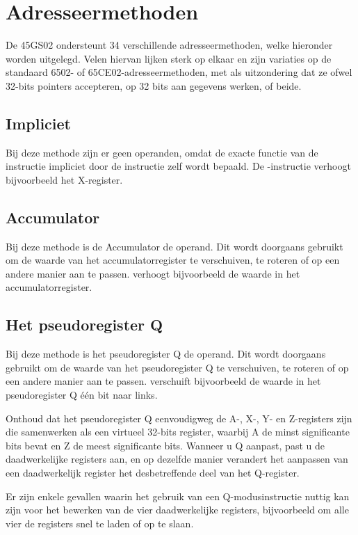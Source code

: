 \section{Adresseermethoden}
\label{sec:addressing-modes}

De 45GS02 ondersteunt 34 verschillende adresseermethoden, welke hieronder worden uitgelegd. Velen hiervan lijken sterk op elkaar en zijn variaties op de standaard 6502- of 65CE02-adresseermethoden, met als uitzondering dat ze ofwel 32-bits pointers accepteren, op 32 bits aan gegevens werken, of beide.

\subsection{Impliciet}

Bij deze methode zijn er geen operanden, omdat de exacte functie van de instructie impliciet door de instructie zelf wordt bepaald. De -instructie verhoogt bijvoorbeeld het X-register.

\subsection{Accumulator}

Bij deze methode is de Accumulator de operand. Dit wordt doorgaans gebruikt om de waarde van het accumulatorregister te verschuiven, te roteren of op een andere manier aan te passen.  verhoogt bijvoorbeeld de waarde in het accumulatorregister.

\subsection{Het pseudoregister Q}

Bij deze methode is het pseudoregister Q de operand. Dit wordt doorgaans gebruikt om de waarde van het pseudoregister Q te verschuiven, te roteren of op een andere manier aan te passen.  verschuift bijvoorbeeld de waarde in het pseudoregister Q één bit naar links.

Onthoud dat het pseudoregister Q eenvoudigweg de A-, X-, Y- en Z-registers zijn die samenwerken als een virtueel 32-bits register, waarbij A de minst significante bits bevat en Z de meest significante bits. Wanneer u Q aanpast, past u de daadwerkelijke registers aan, en op dezelfde manier verandert het aanpassen van een daadwerkelijk register het desbetreffende deel van het Q-register.

Er zijn enkele gevallen waarin het gebruik van een Q-modusinstructie nuttig kan zijn voor het bewerken van de vier daadwerkelijke registers, bijvoorbeeld om alle vier de registers snel te laden of op te slaan.

